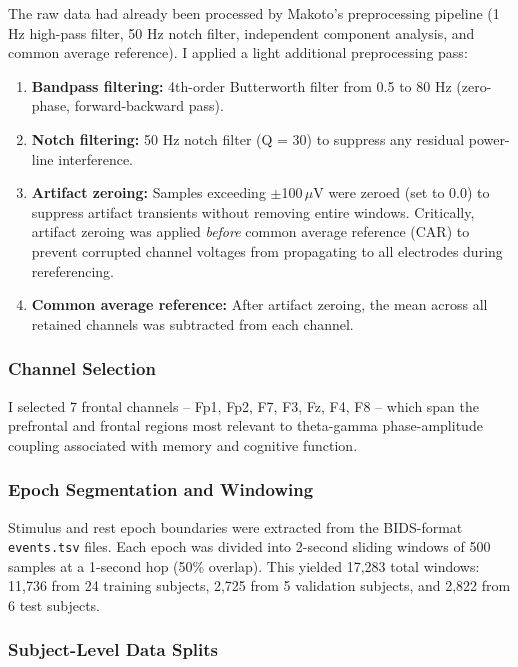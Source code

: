 \documentclass[11pt,letterpaper]{article}
\begin{document}
The raw data had already been processed by Makoto's preprocessing pipeline (1 Hz high-pass filter, 50 Hz notch filter, independent component analysis, and common average reference). I applied a light additional preprocessing pass:

\begin{enumerate}[nosep]
  \item \textbf{Bandpass filtering:} 4th-order Butterworth filter from 0.5 to 80 Hz (zero-phase, forward-backward pass).
  \item \textbf{Notch filtering:} 50 Hz notch filter (Q = 30) to suppress any residual power-line interference.
  \item \textbf{Artifact zeroing:} Samples exceeding $\pm$100\,$\mu$V were zeroed (set to 0.0) to suppress artifact transients without removing entire windows. Critically, artifact zeroing was applied \textit{before} common average reference (CAR) to prevent corrupted channel voltages from propagating to all electrodes during rereferencing.
  \item \textbf{Common average reference:} After artifact zeroing, the mean across all retained channels was subtracted from each channel.
\end{enumerate}

\subsubsection{Channel Selection}

I selected 7 frontal channels -- Fp1, Fp2, F7, F3, Fz, F4, F8 -- which span the prefrontal and frontal regions most relevant to theta-gamma phase-amplitude coupling associated with memory and cognitive function.

\subsubsection{Epoch Segmentation and Windowing}

Stimulus and rest epoch boundaries were extracted from the BIDS-format \texttt{events.tsv} files. Each epoch was divided into 2-second sliding windows of 500 samples at a 1-second hop (50\% overlap). This yielded 17,283 total windows: 11,736 from 24 training subjects, 2,725 from 5 validation subjects, and 2,822 from 6 test subjects.

\subsubsection{Subject-Level Data Splits}
\end{document}

